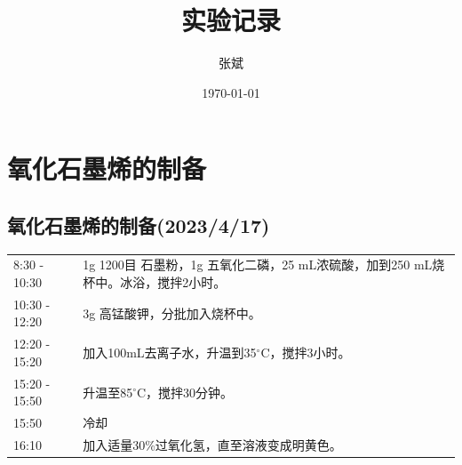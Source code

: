 \documentclass[UTF8,12pt]{ctexart}
\title{实验记录}
\author{张斌}
\date{\today}
\begin{document}
\fancyhead[C]{\leftmark}
\fancyfoot[C]{\thepage}

\maketitle
\tableofcontents
\newpage

\section{氧化石墨烯的制备}

\subsection{氧化石墨烯的制备(2023/4/17)}

\begin{table}[h]
    \centering
    \begin{tabularx}{0.9\textwidth} {
        l
        | >{\raggedright\arraybackslash}X 
         }
         8:30 - 10:30 & 1g 1200目 石墨粉，1g 五氧化二磷，25 mL浓硫酸，加到250 mL烧杯中。冰浴，搅拌2小时。\\
         10:30 - 12:20 & 3g 高锰酸钾，分批加入烧杯中。\\
         12:20 - 15:20 & 加入100mL去离子水，升温到35$^\circ \mathrm{C}$，搅拌3小时。 \\
         15:20 - 15:50 & 升温至85$^\circ \mathrm{C}$，搅拌30分钟。\\
         15:50 & 冷却 \\
         16:10 & 加入适量30\%过氧化氢，直至溶液变成明黄色。
    \end{tabularx}
\end{table}
\end{document}
